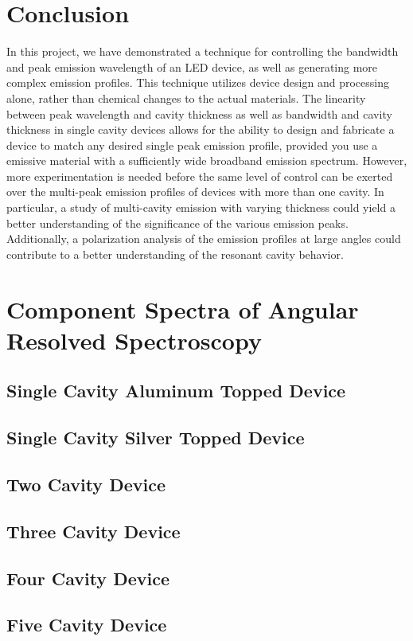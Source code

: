 \documentclass{report}
\begin{document}
\chapter{Conclusion}

    In this project, we have demonstrated a technique for controlling the bandwidth and peak emission wavelength of an LED device, as well as generating more complex emission profiles. This technique utilizes device design and processing alone, rather than chemical changes to the actual materials. The linearity between peak wavelength and cavity thickness as well as bandwidth and cavity thickness in single cavity devices allows for the ability to design and fabricate a device to match any desired single peak emission profile, provided you use a emissive material with a sufficiently wide broadband emission spectrum. However, more experimentation is needed before the same level of control can be exerted over the multi-peak emission profiles of devices with more than one cavity. In particular, a study of multi-cavity emission with varying thickness could yield a better understanding of the significance of the various emission peaks. Additionally, a polarization analysis of the emission profiles at large angles could contribute to a better understanding of the resonant cavity behavior.

\appendix
\chapter{Component Spectra of Angular Resolved Spectroscopy}

    \section*{Single Cavity Aluminum Topped Device}
    
    \section*{Single Cavity Silver Topped Device}
    
    \section*{Two Cavity Device}
    
    \section*{Three Cavity Device}
    
    \section*{Four Cavity Device}
    
    \section*{Five Cavity Device}
\end{document}
